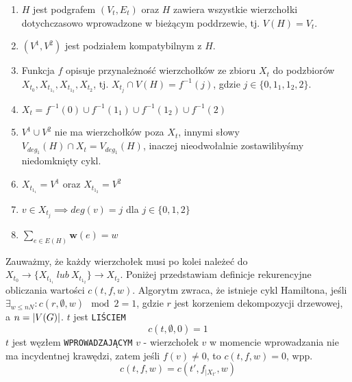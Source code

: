\documentclass[12pt, oneside]{report}
\begin{document}
\begin{enumerate}[label=(\roman*)]
\item $H$ jest podgrafem $(V_t, E_t)$ oraz $H$ zawiera wszystkie wierzchołki dotychczasowo wprowadzone w bieżącym poddrzewie, tj. $V(H) = V_t$.
\item $(V^1, V^2)$ jest podziałem kompatybilnym z $H$.
\item Funkcja $f$ opisuje przynależność wierzchołków ze zbioru $X_t$ do podzbiorów $X_{t_0}, X_{t_{1_1}}, X_{t_{1_2}}, X_{t_2}$, tj. $X_{t_j} \cap V(H) = f^{-1}(j)$, gdzie $j \in \{0,1_1,1_2,2\}$.
\item $X_t = f^{-1}(0) \cup f^{-1}(1_1) \cup f^{-1}(1_2) \cup f^{-1}(2)$
\item $V^1 \cup V^2$ nie ma wierzchołków poza $X_t$, innymi słowy $V_{deg_1}(H) \cap X_t = V_{deg_1}(H)$, inaczej nieodwołalnie zostawilibyśmy niedomknięty cykl.
\item $X_{t_{1_1}} = V^1$ oraz $X_{t_{1_2}} = V^2$
\item $v \in X_{t_j} \implies deg(v) = j$ dla $j \in \{0,1,2\}$
\item $\sum_{e \in E(H)} \mathbf{w}(e) = w$
\end{enumerate}

Zauważmy, że każdy wierzchołek musi po kolei należeć do $X_{t_0} \to \{X_{t_{1_1}} \ lub \ X_{t_{1_2}}\} \to X_{t_2}$. Poniżej przedstawiam definicje rekurencyjne obliczania wartości $c(t,f,w)$. Algorytm zwraca, że istnieje cykl Hamiltona, jeśli $\exists_{w \leq nN}: c(r,\emptyset,w) \mod 2 = 1$, gdzie $r$ jest korzeniem dekompozycji drzewowej, a $n = \abs{V(G)}$.
\newline\newline
$t$ jest \texttt{LIŚCIEM}
$$c(t,\emptyset,0) = 1$$
\newline
$t$ jest węzłem \texttt{WPROWADZAJĄCYM} $v$ - wierzchołek $v$ w momencie wprowadzania nie ma incydentnej krawędzi, zatem jeśli $f(v) \neq 0$, to $c(t,f,w) = 0$, wpp.
$$c(t,f,w) = c(t',f_{\big|X_{t'}},w)$$
\end{document}
